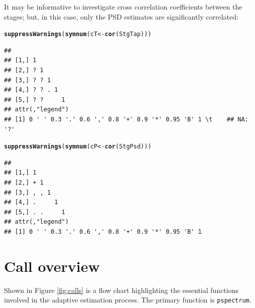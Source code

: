\documentclass[10pt]{article}\usepackage[]{graphicx}\usepackage[]{color}
\makeatletter
\newcommand{\hlstd}[1]{\textcolor[rgb]{0.345,0.345,0.345}{#1}}%
\newcommand{\hlkwb}[1]{\textcolor[rgb]{0.69,0.353,0.396}{#1}}%
\newcommand{\hlkwd}[1]{\textcolor[rgb]{0.737,0.353,0.396}{\textbf{#1}}}%
\newenvironment{kframe}{%
 \def\at@end@of@kframe{}%
 \ifinner\ifhmode%
  \def\at@end@of@kframe{\end{minipage}}%
  \begin{minipage}{\columnwidth}%
 \fi\fi%
 \def\FrameCommand##1{\hskip\@totalleftmargin \hskip-\fboxsep
 \colorbox{shadecolor}{##1}\hskip-\fboxsep
     \hskip-\linewidth \hskip-\@totalleftmargin \hskip\columnwidth}%
 \MakeFramed {\advance\hsize-\width
   \@totalleftmargin\z@ \linewidth\hsize
   \@setminipage}}%
 {\par\unskip\endMakeFramed%
 \at@end@of@kframe}
\newenvironment{knitrout}{}{} %
\newcommand{\Rcmd}[1]{\texttt{#1}}
\makeatother
\begin{document}
It may be informative to investigate cross correlation
coefficients between the stages;
but, in this case, only the PSD estimates are significantly correlated:
\begin{knitrout}
\color{fgcolor}\begin{kframe}
\begin{alltt}
\hlkwd{suppressWarnings}\hlstd{(}\hlkwd{symnum}\hlstd{( cT} \hlkwb{<-} \hlkwd{cor}\hlstd{(StgTap) ))}
\end{alltt}
\begin{verbatim}
##               
## [1,] 1        
## [2,] ? 1      
## [3,] ? ? 1    
## [4,] ? ? . 1  
## [5,] ? ?     1
## attr(,"legend")
## [1] 0 ' ' 0.3 '.' 0.6 ',' 0.8 '+' 0.9 '*' 0.95 'B' 1 \t    ## NA: '?'
\end{verbatim}
\end{kframe}
\end{knitrout}
\begin{knitrout}
\color{fgcolor}\begin{kframe}
\begin{alltt}
\hlkwd{suppressWarnings}\hlstd{(}\hlkwd{symnum}\hlstd{( cP} \hlkwb{<-} \hlkwd{cor}\hlstd{(StgPsd) ))}
\end{alltt}
\begin{verbatim}
##               
## [1,] 1        
## [2,] + 1      
## [3,] , , 1    
## [4,] .     1  
## [5,] . .     1
## attr(,"legend")
## [1] 0 ' ' 0.3 '.' 0.6 ',' 0.8 '+' 0.9 '*' 0.95 'B' 1
\end{verbatim}
\end{kframe}
\end{knitrout}


\section{Call overview}

Shown
in Figure \ref{fig:calls}
is a flow chart 
highlighting the essential
functions involved in the adaptive estimation
process. The primary function is \Rcmd{pspectrum}.
\end{document}
